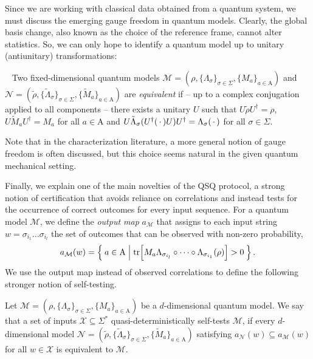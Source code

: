 \documentclass[../main.tex]{subfiles}
\begin{document}
Since we are working with classical data obtained from a quantum system, we must discuss the emerging gauge freedom in quantum models. Clearly, the global basis change, also known as the choice of the reference frame, cannot alter statistics. So, we can only hope to identify a quantum model up to unitary (antiunitary) transformations: 

\begin{definition}~\label{def:modelequivalence}
Two fixed-dimensional quantum models $\mathcal{M} = (\rho,\{\Lambda_\sigma\}_{\sigma \in \Sigma},\{M_a\}_{a\in \mathrm{A}})$ and $\mathcal{N}=(\tilde\rho,\{\tilde\Lambda_\sigma \}_{\sigma \in \Sigma},\{\tilde M_a\}_{a\in \mathrm{A}})$ are \emph{equivalent} if -- up to a complex conjugation applied to all components -- there exists a unitary $U$ such that $U\tilde\rho U^\dagger = \rho$, $U\tilde M_a U^\dagger = M_a$ for all $a\in \mathrm{A}$ and $ U\tilde\Lambda_\sigma(U^\dagger (\,\cdot\,) U)U^\dagger=\Lambda_\sigma(\,\cdot\,)$ for all $\sigma\in \Sigma$.
\end{definition}
Note that in the characterization literature, a more general notion of gauge freedom is often discussed, but this choice seems natural in the given quantum mechanical setting.


Finally, we explain one of the main novelties of the QSQ protocol, a strong notion of certification that avoids reliance on correlations and instead tests for the occurrence of correct outcomes for every input sequence.
For a quantum model $\mathcal{M}$, we define the \emph{output map} $a_\mathcal{M}$
that assigns to each input string $w=\sigma_{i_1}\dots \sigma_{i_l}$ the set of outcomes that can be observed with non-zero probability, 
\begin{equation}
    a_\mathcal{M}(w)= \Set{a\in \mathrm{A} | \tr[M_a \Lambda_{\sigma_{i_l}}\circ\dots \circ\Lambda_{\sigma_{i_1}}(\rho)]>0}. 
\end{equation}
We use the output map instead of observed correlations to define the following stronger notion of self-testing.

\begin{definition}
\label{def:self-testing}
    Let $\mathcal{M} = (\rho,\{\Lambda_\sigma\}_{ \sigma \in \Sigma},\{M_a\}_{a\in \mathrm{A}})$ be a $d$-dimensional quantum model. 
    We say that a set of inputs $\mathcal{X}\subseteq \Sigma^*$ quasi-deterministically self-tests $\mathcal{M}$, if every $d$-dimensional model $\mathcal{N}=(\tilde\rho,\{\tilde\Lambda_{\sigma}\}_{\sigma \in \Sigma},\{\tilde M_a\}_{a\in \mathrm{A}})$ satisfying $a_\mathcal{N}(w) \subseteq a_{\mathcal{M}}(w)$ for all $w\in\mathcal{X} $  is equivalent to $\mathcal{M}$.
\end{definition}
\end{document}
